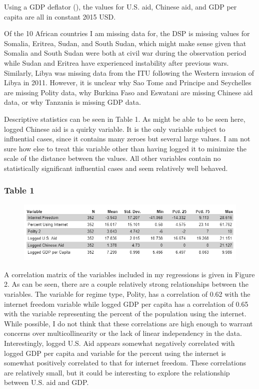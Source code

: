 \documentclass[12pt]{article}
\begin{document}
Using a GDP deflator (\cite{organizationforeconomicco-operationanddevelopment2022}), the values for U.S. aid, Chinese aid, and GDP per capita are all in constant 2015 USD.

Of the 10 African countries I am missing data for, the DSP is missing values for Somalia, Eritrea, Sudan, and South Sudan, which might make sense given that Somalia and South Sudan were both at civil war during the observation period while Sudan and Eritrea have experienced instability after previous wars. Similarly, Libya was missing data from the ITU following the Western invasion of Libya in 2011. However, it is unclear why Sao Tome and Principe and Seychelles are missing Polity data, why Burkina Faso and Eswatani are missing Chinese aid data, or why Tanzania is missing GDP data.

\pagebreak
Descriptive statistics can be seen in Table 1. As might be able to be seen here, logged Chinese aid is a quirky variable. It is the only variable subject to influential cases, since it contains many zeroes but several large values. I am not sure how else to treat this variable other than having logged it to minimize the scale of the distance between the values. All other variables contain no statistically significant influential cases and seem relatively well behaved.

\subsubsection*{Table 1}
\begin{figure}[htbp]
    \includegraphics[scale=1.1]{628table2.png}
\end{figure}

A correlation matrix of the variables included in my regressions is given in Figure 2. As can be seen, there are a couple relatively strong relationships between the variables. The variable for regime type, Polity, has a correlation of 0.62 with the internet freedom variable while logged GDP per capita has a correlation of 0.65 with the variable representing the percent of the population using the internet. While possible, I do not think that these correlations are high enough to warrant concerns over multicollinearity or the lack of linear independency in the data. Interestingly, logged U.S. Aid appears somewhat negatively correlated with logged GDP per capita and variable for the percent using the internet is somewhat positively correlated to that for internet freedom. These correlations are relatively small, but it could be interesting to explore the relationship between U.S. aid and GDP.
\end{document}
